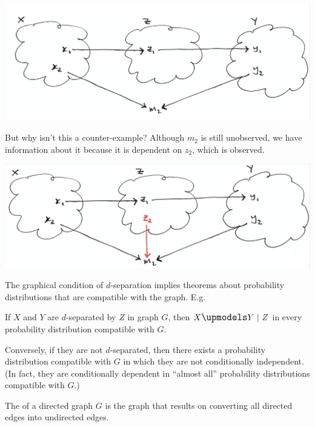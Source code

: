 \includegraphics[width=400pt]{img/statistics-and-machine-learning--pearl--causality--conditional-independence-and-graphoids-1231.png}

But why isn't this a counter-example? Although $m_2$ is still unobserved, we have information about it because
it is dependent on $z_2$, which is observed.

\includegraphics[width=400pt]{img/statistics-and-machine-learning--pearl--causality--conditional-independence-and-graphoids-7e5e.png}

The graphical condition of $d$-separation implies theorems about probability distributions that are compatible with the graph. E.g.

\begin{theorem}
  If $X$ and $Y$ are $d$-separated by $Z$ in graph $G$, then $X \indep Y ~|~ Z$ in every probability
  distribution compatible with $G$.

  Conversely, if they are not $d$-separated, then there exists a probability distribution compatible with $G$
  in which they are not conditionally independent. (In fact, they are conditionally dependent in ``almost all​''
  probability distributions compatible with $G$.)
\end{theorem}

\begin{definition}[Skeleton]
  The  of a directed graph $G$ is the graph that results on converting all directed edges into
  undirected edges.
\end{definition}


